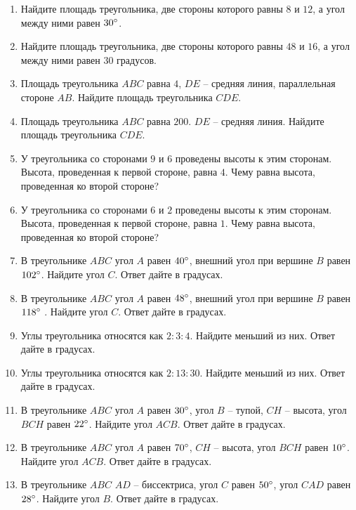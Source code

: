 \documentclass[12pt, a4paper]{article}
\begin{document}
	
	\begin{enumerate}
		\item Найдите площадь треугольника, две стороны которого равны \( 8 \) и \( 12 \), а угол между ними равен \( 30\degree \).
		\item Найдите площадь треугольника, две стороны которого равны \( 48  \) и \( 16 \), а угол между ними равен \( 30  \) градусов.
		\item Площадь треугольника \( ABC \) равна \( 4 \), \( DE\) – средняя линия, параллельная стороне \( AB \). Найдите площадь треугольника \( CDE \).
		\item Площадь треугольника \( ABC  \) равна \( 200 \). \( DE \) – средняя линия. Найдите площадь треугольника \( CDE \).
		\item У треугольника со сторонами \( 9 \) и \( 6  \) проведены высоты к этим сторонам. Высота, проведенная к первой стороне, равна \( 4 \). Чему равна высота, проведенная ко второй стороне?
		\item У треугольника со сторонами \( 6 \) и \( 2 \) проведены высоты к этим сторонам. Высота, проведенная к первой стороне, равна \( 1 \). Чему равна высота, проведенная ко второй стороне?
		\item В треугольнике \( ABC \) угол \( A \) равен \( 40 \degree\), внешний угол при вершине \( B \) равен \( 102 \degree\). Найдите угол \( C \). Ответ дайте в градусах.
		\item В треугольнике \( ABC  \) угол \( A \) равен \( 48 \degree\), внешний угол при вершине \( B \) равен \( 118 \degree\) . Найдите угол \( C \). Ответ дайте в градусах.
		\item Углы треугольника относятся как \(2:3:4\). Найдите меньший из них. Ответ дайте в градусах.
		\item Углы треугольника относятся как \(2:13:30\). Найдите меньший из них. Ответ дайте в градусах.
		\item В треугольнике \( ABC \) угол \( A \) равен \( 30\degree\), угол \( B \) – тупой, \(CH\) – высота, угол \( BCH \) равен \( 22 \degree \). Найдите угол \( ACB \). Ответ дайте в градусах.
		\item В треугольнике \( ABC \) угол \( A \) равен \( 70 \degree\), \( CH \) – высота, угол \( BCH \) равен \( 10\degree \). Найдите угол \( ACB \). Ответ дайте в градусах.
		\item В треугольнике \( ABC \) \( AD \) – биссектриса, угол \( C \) равен \( 50\degree \), угол \( CAD \) равен \( 28\degree \). Найдите угол \( B \). Ответ дайте в градусах.

\end{enumerate}
\end{document}
